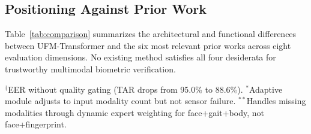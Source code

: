 \documentclass[10pt,journal,compsoc]{IEEEtran}
\begin{document}
\subsection{Positioning Against Prior Work}

Table~\ref{tab:comparison} summarizes the architectural and functional differences between UFM-Transformer and the six most relevant prior works across eight evaluation dimensions. No existing method satisfies all four desiderata for trustworthy multimodal biometric verification.

\begin{table}[htbp]
\centering
\caption{Comparison of UFM-Transformer with six closest prior works. For EER, results are reported as published on the respective evaluation dataset; direct cross-dataset comparison is not meaningful.}
\label{tab:comparison}
\begin{tablenotes}
\item $^\dagger$EER without quality gating (TAR drops from 95.0\% to 88.6\%). $^*$Adaptive module adjusts to input modality count but not sensor failure. $^{**}$Handles missing modalities through dynamic expert weighting for face+gait+body, not face+fingerprint.
\end{tablenotes}
\end{table}
\end{document}
